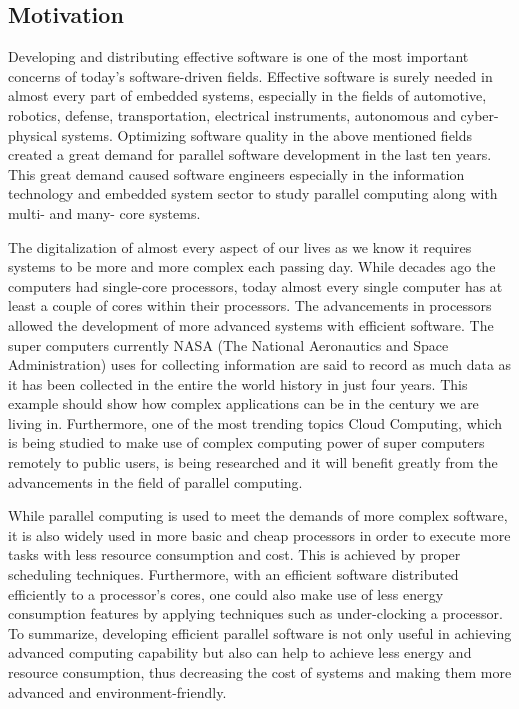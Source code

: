 \subsection{Motivation}
Developing and distributing effective software is one of the most important concerns of today's software-driven fields. Effective software is surely needed in almost every part of embedded systems, especially in the fields of automotive, robotics, defense, transportation, electrical instruments, autonomous and cyber-physical systems. Optimizing software quality in the above mentioned fields created a great demand for parallel software development in the last ten years. This great demand caused software engineers especially in the information technology and embedded system sector to study parallel computing along with multi- and many- core systems.

The digitalization of almost every aspect of our lives as we know it requires systems to be more and more complex each passing day. While decades ago the computers had single-core processors, today almost every single computer has at least a couple of cores within their processors. The advancements in processors allowed the development of more advanced systems with efficient software. The super computers currently NASA (The National Aeronautics and Space Administration) uses for collecting information are said to record as much data as it has been collected in the entire the world history in just four years. %
This example should show how complex applications can be in the century we are living in. Furthermore, one of the most trending topics Cloud Computing, which is being studied to make use of complex computing power of super computers remotely to public users, is being researched and it will benefit greatly from the advancements in the field of parallel computing.

While parallel computing is used to meet the demands of more complex software, it is also widely used in more basic and cheap processors in order to execute more tasks with less resource consumption and cost. This is achieved by proper scheduling techniques. Furthermore, with an efficient software distributed efficiently to a processor's cores, one could also make use of less energy consumption features by applying techniques such as under-clocking a processor. To summarize, developing efficient parallel software is not only useful in achieving advanced computing capability but also can help to achieve less energy and resource consumption, thus decreasing the cost of systems and making them more advanced and environment-friendly.

